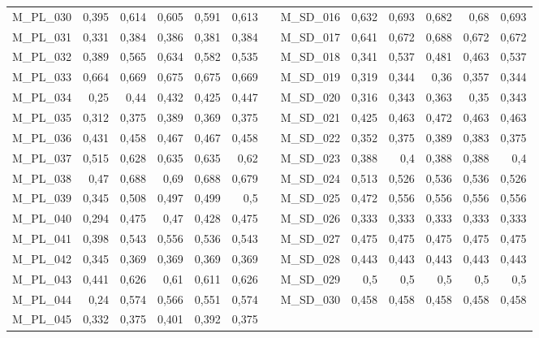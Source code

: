 \begin{table}[hp]
\begin{adjustbox}{angle=90}
\begin{tabular}{lrrrrrrrrrrrr}
    M\_PL\_030 & 0,395 & 0,614 & 0,605 & 0,591 & 0,613 &      & M\_SD\_016 & 0,632 & 0,693 & 0,682 & 0,68 & 0,693 \\
    M\_PL\_031 & 0,331 & 0,384 & 0,386 & 0,381 & 0,384 &      & M\_SD\_017 & 0,641 & 0,672 & 0,688 & 0,672 & 0,672 \\
    M\_PL\_032 & 0,389 & 0,565 & 0,634 & 0,582 & 0,535 &      & M\_SD\_018 & 0,341 & 0,537 & 0,481 & 0,463 & 0,537 \\
    M\_PL\_033 & 0,664 & 0,669 & 0,675 & 0,675 & 0,669 &      & M\_SD\_019 & 0,319 & 0,344 & 0,36 & 0,357 & 0,344 \\
    M\_PL\_034 & 0,25 & 0,44 & 0,432 & 0,425 & 0,447 &      & M\_SD\_020 & 0,316 & 0,343 & 0,363 & 0,35 & 0,343 \\
    M\_PL\_035 & 0,312 & 0,375 & 0,389 & 0,369 & 0,375 &      & M\_SD\_021 & 0,425 & 0,463 & 0,472 & 0,463 & 0,463 \\
    M\_PL\_036 & 0,431 & 0,458 & 0,467 & 0,467 & 0,458 &      & M\_SD\_022 & 0,352 & 0,375 & 0,389 & 0,383 & 0,375 \\
    M\_PL\_037 & 0,515 & 0,628 & 0,635 & 0,635 & 0,62 &      & M\_SD\_023 & 0,388 & 0,4  & 0,388 & 0,388 & 0,4 \\
    M\_PL\_038 & 0,47 & 0,688 & 0,69 & 0,688 & 0,679 &      & M\_SD\_024 & 0,513 & 0,526 & 0,536 & 0,536 & 0,526 \\
    M\_PL\_039 & 0,345 & 0,508 & 0,497 & 0,499 & 0,5  &      & M\_SD\_025 & 0,472 & 0,556 & 0,556 & 0,556 & 0,556 \\
    M\_PL\_040 & 0,294 & 0,475 & 0,47 & 0,428 & 0,475 &      & M\_SD\_026 & 0,333 & 0,333 & 0,333 & 0,333 & 0,333 \\
    M\_PL\_041 & 0,398 & 0,543 & 0,556 & 0,536 & 0,543 &      & M\_SD\_027 & 0,475 & 0,475 & 0,475 & 0,475 & 0,475 \\
    M\_PL\_042 & 0,345 & 0,369 & 0,369 & 0,369 & 0,369 &      & M\_SD\_028 & 0,443 & 0,443 & 0,443 & 0,443 & 0,443 \\
    M\_PL\_043 & 0,441 & 0,626 & 0,61 & 0,611 & 0,626 &      & M\_SD\_029 & 0,5  & 0,5  & 0,5  & 0,5  & 0,5 \\
    M\_PL\_044 & 0,24 & 0,574 & 0,566 & 0,551 & 0,574 &      & M\_SD\_030 & 0,458 & 0,458 & 0,458 & 0,458 & 0,458 \\
    M\_PL\_045 & 0,332 & 0,375 & 0,401 & 0,392 & 0,375 &      &      &      &      &      &      &  \\
    \bottomrule
    \end{tabular}%
    \end{adjustbox}

\end{table}
